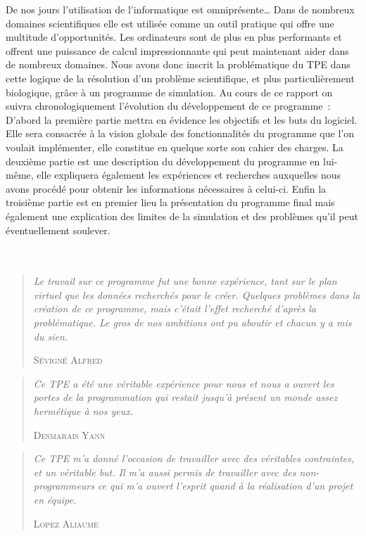 De nos jours l’utilisation de l’informatique est omniprésente… Dans de nombreux domaines scientifiques elle est utilisée comme un outil  pratique qui offre une multitude d’opportunités. Les ordinateurs sont de plus en plus performants et offrent une puissance de calcul impressionnante qui peut maintenant aider dans de nombreux domaines. Nous avons donc inscrit la problématique du TPE dans cette logique de la résolution d’un problème scientifique, et plus particulièrement biologique, grâce à un programme de simulation. Au cours de ce rapport on suivra chronologiquement l’évolution du développement de ce programme : D’abord la première partie mettra en évidence les objectifs et les buts du logiciel. Elle sera consacrée à la vision globale des fonctionnalités du programme que l’on voulait implémenter, elle constitue en quelque sorte son cahier des charges. La deuxième partie est une description du développement du programme en lui-même, elle expliquera également les expériences et recherches auxquelles nous avons procédé pour obtenir les informations nécessaires à celui-ci. Enfin la troisième partie est en premier lieu la présentation du programme final mais également une explication des limites de la simulation et des problèmes qu’il peut éventuellement soulever. \\ \\ \\


\begin{quotation}
  \textit{
    Le travail sur ce programme fut une bonne expérience, tant sur le plan virtuel que les données recherchés pour le créer. Quelques problèmes dans la création de ce programme, mais c'était l'effet recherché d'après la problématique. Le gros de nos ambitions ont pu aboutir et chacun y a mis du sien.
  }
  \begin{flushright}
    \textsc{Sévigné Alfred}
  \end{flushright}
\end{quotation}


\begin{quotation}
  \textit{
    Ce TPE a été une véritable expérience pour nous et nous a ouvert les portes de la programmation qui restait jusqu'à présent un monde assez hermétique à nos yeux.
  }
  \begin{flushright}
    \textsc{Desmarais Yann}
  \end{flushright}
\end{quotation}

\begin{quotation}
  \textit{
    Ce TPE m'a donné l'occasion de travailler avec des véritables contraintes, et un véritable but.
    Il m'a aussi permis de travailler avec des non-programmeurs ce qui m'a ouvert l'esprit quand à la réalisation d'un projet en équipe.
  }
  \begin{flushright}
    \textsc{Lopez Aliaume}
  \end{flushright}
\end{quotation}
